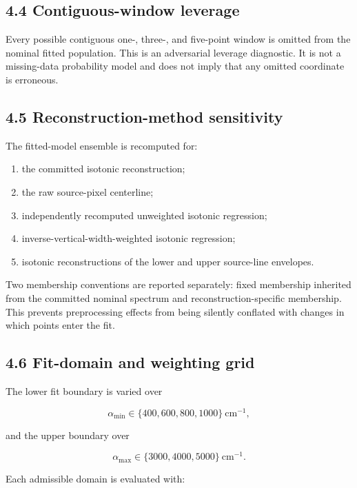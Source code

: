 \subsection{4.4 Contiguous-window
leverage}\label{contiguous-window-leverage}

Every possible contiguous one-, three-, and five-point window is omitted
from the nominal fitted population. This is an adversarial leverage
diagnostic. It is not a missing-data probability model and does not
imply that any omitted coordinate is erroneous.

\subsection{4.5 Reconstruction-method
sensitivity}\label{reconstruction-method-sensitivity}

The fitted-model ensemble is recomputed for:

\begin{enumerate}
\def\labelenumi{\arabic{enumi}.}
\tightlist
\item
  the committed isotonic reconstruction;
\item
  the raw source-pixel centerline;
\item
  independently recomputed unweighted isotonic regression;
\item
  inverse-vertical-width-weighted isotonic regression;
\item
  isotonic reconstructions of the lower and upper source-line envelopes.
\end{enumerate}

Two membership conventions are reported separately: fixed membership
inherited from the committed nominal spectrum and
reconstruction-specific membership. This prevents preprocessing effects
from being silently conflated with changes in which points enter the
fit.

\subsection{4.6 Fit-domain and weighting
grid}\label{fit-domain-and-weighting-grid}

The lower fit boundary is varied over

\[
\alpha_{\min}\in\{400,600,800,1000\}\ \mathrm{cm}^{-1},
\]

and the upper boundary over

\[
\alpha_{\max}\in\{3000,4000,5000\}\ \mathrm{cm}^{-1}.
\]

Each admissible domain is evaluated with:

